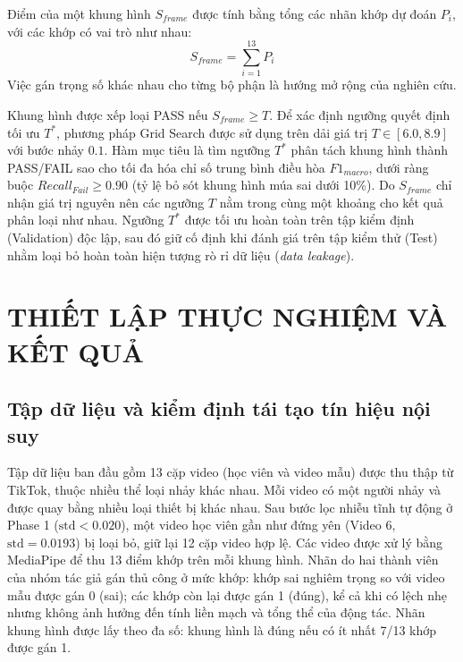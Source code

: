 \documentclass[10pt,conference,a4paper]{IEEEtran}
\begin{document}
Điểm của một khung hình $S_{frame}$ được tính bằng tổng các nhãn khớp dự đoán $P_i$, với các khớp có vai trò như nhau:
\begin{equation}
S_{frame} = \sum_{i=1}^{13} P_i
\end{equation}
Việc gán trọng số khác nhau cho từng bộ phận là hướng mở rộng của nghiên cứu.

Khung hình được xếp loại PASS nếu $S_{frame} \ge T$. Để xác định ngưỡng quyết định tối ưu $T^*$, phương pháp Grid Search được sử dụng trên dải giá trị $T \in [6.0, 8.9]$ với bước nhảy $0.1$. Hàm mục tiêu là tìm ngưỡng $T^*$ phân tách khung hình thành PASS/FAIL sao cho tối đa hóa chỉ số trung bình điều hòa $F1_{macro}$, dưới ràng buộc $Recall_{Fail} \ge 0.90$ (tỷ lệ bỏ sót khung hình múa sai dưới 10\%). Do $S_{frame}$ chỉ nhận giá trị nguyên nên các ngưỡng $T$ nằm trong cùng một khoảng cho kết quả phân loại như nhau. Ngưỡng $T^*$ được tối ưu hoàn toàn trên tập kiểm định (Validation) độc lập, sau đó giữ cố định khi đánh giá trên tập kiểm thử (Test) nhằm loại bỏ hoàn toàn hiện tượng rò rỉ dữ liệu (\textit{data leakage}).

\section{THIẾT LẬP THỰC NGHIỆM VÀ KẾT QUẢ}
\label{Sec:ThietLapVaKetQua}

\subsection{Tập dữ liệu và kiểm định tái tạo tín hiệu nội suy}
Tập dữ liệu ban đầu gồm 13 cặp video (học viên và video mẫu) được thu thập từ TikTok, thuộc nhiều thể loại nhảy khác nhau. Mỗi video có một người nhảy và được quay bằng nhiều loại thiết bị khác nhau. Sau bước lọc nhiễu tĩnh tự động ở Phase 1 ($\text{std} < 0.020$), một video học viên gần như đứng yên (Video 6, $\text{std} = 0.0193$) bị loại bỏ, giữ lại 12 cặp video hợp lệ. Các video được xử lý bằng MediaPipe để thu 13 điểm khớp trên mỗi khung hình. Nhãn do hai thành viên của nhóm tác giả gán thủ công ở mức khớp: khớp sai nghiêm trọng so với video mẫu được gán 0 (sai); các khớp còn lại được gán 1 (đúng), kể cả khi có lệch nhẹ nhưng không ảnh hưởng đến tính liền mạch và tổng thể của động tác. Nhãn khung hình được lấy theo đa số: khung hình là đúng nếu có ít nhất 7/13 khớp được gán 1.
\end{document}
